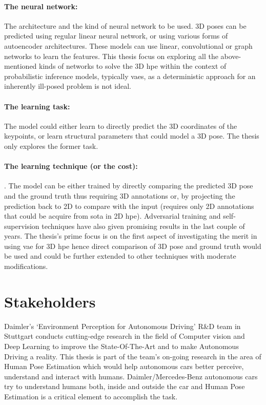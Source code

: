 \paragraph{The neural network:} The architecture and the kind of neural network to be used. 3D poses can be predicted using regular linear neural network, or using various forms of autoencoder architectures. These models can use linear, convolutional or graph networks to learn the features. This thesis focus on exploring all the above-mentioned kinds of networks to solve the 3D \ac{hpe} within the context of probabilistic inference models, typically \ac{vae}s, as a deterministic approach for an inherently ill-posed problem is not ideal. 

\paragraph{The learning task:} The model could either learn to directly predict the 3D coordinates of the keypoints, or learn structural parameters that could model a 3D pose. The thesis only explores the former task.

\paragraph{The learning technique (or the cost):}. The model can be either trained by directly comparing the predicted 3D pose and the ground truth thus requiring 3D annotations or, by projecting the prediction back to 2D to compare with the input (requires only 2D annotations that could be acquire from \ac{sota} in 2D \ac{hpe}). Adversarial training and self-supervision techniques have also given promising results in the last couple of years. The thesis's prime focus is on the first aspect of investigating the merit in using \ac{vae} for 3D \ac{hpe} hence direct comparison of 3D pose and ground truth would be used and could be further extended to other techniques with moderate modifications.


\section{Stakeholders}
Daimler’s ‘Environment Perception for Autonomous Driving’ R\&D team in Stuttgart conducts cutting-edge research in the field of Computer vision and Deep Learning to improve the State-Of-The-Art and to make Autonomous Driving a reality. This thesis is part of the team’s on-going research in the area of Human Pose Estimation which would help autonomous cars better perceive, understand and interact with humans. Daimler/Mercedes-Benz autonomous cars try to understand humans both, inside and outside the car and Human Pose Estimation is a critical element to accomplish the task.

